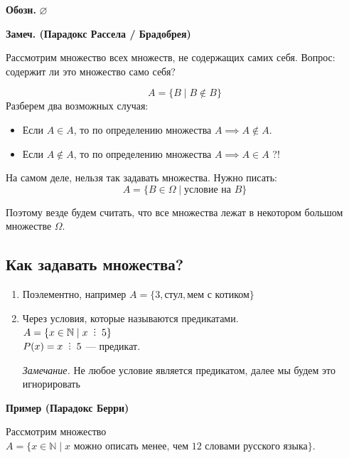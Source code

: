 \documentclass[10pt, a4paper]{article}
\def\divby{%
  \mathrel{\text{\vbox{\baselineskip.65ex\lineskiplimit0pt\hbox{.}\hbox{.}\hbox{.}}}}%
}
\begin{document}
\vspace{0.2cm}
\noindent \textbf{Обозн.} $\varnothing$

\vspace{0.6cm}

\noindent \textbf{Замеч. (Парадокс Рассела / Брадобрея)}

\vspace{0.2cm}
\noindent Рассмотрим множество всех множеств, не содержащих самих себя. 
Вопрос: содержит ли это множество само себя?

\[ A = \{ B \mid B \notin B \} \]
\newpage
\noindent Разберем два возможных случая:
\begin{itemize}
    \item Если $A \in A$, то по определению множества $A \implies A \notin A$.
    \item Если $A \notin A$, то по определению множества $A \implies A \in A$ \quad ?!
\end{itemize}

На самом деле, нельзя так задавать множества. Нужно писать:
\[ A = \{ B \in \Omega \mid \text{условие на } B \} \]

\noindent Поэтому везде будем считать, что все множества лежат в некотором большом множестве $\Omega$.

\vspace{0.3cm}

\subsection*{Как задавать множества?}

\begin{enumerate}
    \item Поэлементно, например $A = \{3, \text{стул}, \text{мем с котиком}\}$
    \item Через условия, которые называются предикатами. \\
    $A = \{ x \in \mathbb{N} \mid x \;\divby\; 5 \}$ \\
    $P(x) = x \;\divby\; 5$ --- предикат.
    
    \textit{Замечание.} Не любое условие является предикатом, далее мы будем это игнорировать
\end{enumerate}

\vspace{0.3cm}
\noindent \textbf{Пример (Парадокс Берри)}

\vspace{0.2cm}
\noindent Рассмотрим множество $A = \{ x \in \mathbb{N} \mid x \text{ можно описать менее, чем 12 словами русского языка} \}$.
\end{document}
